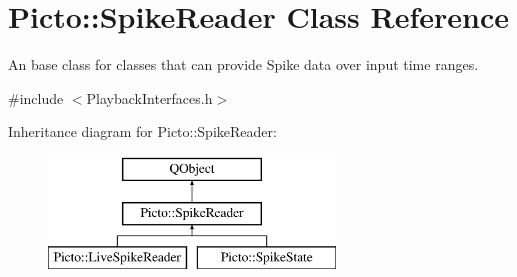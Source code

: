 \hypertarget{class_picto_1_1_spike_reader}{\section{Picto\-:\-:Spike\-Reader Class Reference}
\label{class_picto_1_1_spike_reader}
}


An base class for classes that can provide Spike data over input time ranges.  




{\ttfamily \#include $<$Playback\-Interfaces.\-h$>$}

Inheritance diagram for Picto\-:\-:Spike\-Reader\-:\begin{figure}[H]
\begin{center}
\leavevmode
\includegraphics[height=3.000000cm]{class_picto_1_1_spike_reader}
\end{center}
\end{figure}
